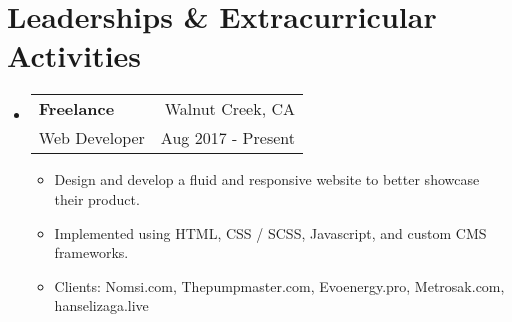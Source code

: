 \documentclass[letterpaper,11pt]{article}
\makeatletter
\newcommand{\resumeSubheading}[4]{
	\vspace{-1pt}\item
	\begin{tabular*}{0.97\textwidth}{l@{\extracolsep{\fill}}r}
		\textbf{#1} & #2 \\
		\small#3 & \small #4 \\
	\end{tabular*}\vspace{-5pt}
}
\newcommand{\resumeSubHeadingListStart}{\begin{itemize}[leftmargin=*]}
\newcommand{\resumeSubHeadingListEnd}{\end{itemize}}
\makeatother
\begin{document}
	
	\section{Leaderships \& Extracurricular Activities}
	\resumeSubHeadingListStart
	\resumeSubheading
	{Freelance}{Walnut Creek, CA}
	{Web Developer}{Aug 2017 - Present}
	\begin{itemize}
		\item {Design and develop a fluid and responsive website to better showcase their product.}  
		\item {Implemented using HTML, CSS / SCSS, Javascript, and custom CMS frameworks.}  
		\item {Clients: Nomsi.com, Thepumpmaster.com, Evoenergy.pro, Metrosak.com, hanselizaga.live}  
	\end{itemize}
	\resumeSubHeadingListEnd
	
	
	
	
\end{document}
